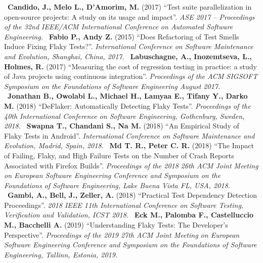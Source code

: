 \newline~\newline
[S9] \textbf{Candido, J., Melo L., D’Amorim, M.} (2017) “Test suite parallelization in open-source projects: A study on its usage and impact”. \emph{ASE 2017 – Proceedings of the 32nd IEEE/ACM International Conference on Automated Software
Engineering.}
\newline~\newline
[S10] \textbf{Fabio P., Andy Z.} (2015) “Does Refactoring of Test Smells Induce Fixing Flaky Tests?”. \emph{International Conference on Software Maintenance and Evolution, Shanghai, China, 2017.}
\newline~\newline
[S11] \textbf{Labuschagne, A., Inozemtseva, L., Holmes, R.} (2017) “Measuring the cost of regression testing in practice: a study of Java projects using continuous integration”. \emph{Proceedings of the ACM SIGSOFT Symposium on the Foundations of Software Engineering August 2017.}
\newline~\newline
[S12] \textbf{Jonathan B., Owolabi L., Michael H., Lamyaa E., Tifany Y., Darko M.} (2018) “DeFlaker: Automatically Detecting Flaky Tests”. \emph{Proceedings of the 40th International Conference on Software Engineering, Gothenburg, Sweden, 2018.}
\newline~\newline
[S13] \textbf{Swapna T., Chandani S., Na M.} (2018) “An Empirical Study of Flaky Tests in Android”. \emph{International Conference on Software Maintenance and Evolution, Madrid, Spain, 2018.}
\newline~\newline
[S14] \textbf{Md T. R., Peter C. R.} (2018) “The Impact of Failing, Flaky, and High Failure Tests on the Number of Crash Reports Associated with Firefox Builds”. \emph{Proceedings of the 2018 26th ACM Joint Meeting on European Software Engineering Conference and Symposium on the Foundations of Software Engineering, Lake Buena Vista FL, USA, 2018.}
\newline~\newline
[S15] \textbf{Gambi, A., Bell, J., Zeller, A.} (2018) “Practical Test Dependency Detection Proceedings”. \emph{2018 IEEE 11th International Conference on Software Testing, Verification and Validation, ICST 2018.}
\newline~\newline
[S16] \textbf{Eck M., Palomba F., Castelluccio M., Bacchelli A.} (2019)
“Understanding Flaky Tests: The Developer’s Perspective”. \emph{Proceedings of the 2019 27th ACM Joint Meeting on European Software Engineering Conference and Symposium on the Foundations of Software Engineering, Tallinn, Estonia, 2019.}
